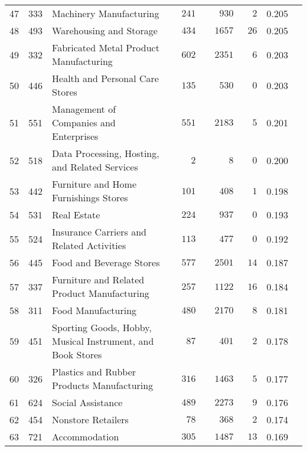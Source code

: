 \documentclass[9pt, oneside]{article}   	%
\begin{document}
\begin{longtable}{lcp{3 in}ccccc}
47  & 333 & Machinery Manufacturing & $\phantom{00}241$ & $\phantom{000}930$ & $\phantom{00}2$ & 0.205 \\
48  & 493 & Warehousing and Storage & $\phantom{00}434$ & $\phantom{00}1657$ & $\phantom{0}26$ & 0.205 \\
49  & 332 & Fabricated Metal Product Manufacturing & $\phantom{00}602$ & $\phantom{00}2351$ & $\phantom{00}6$ & 0.203 \\
50  & 446 & Health and Personal Care Stores & $\phantom{00}135$ & $\phantom{000}530$ & $\phantom{00}0$ & 0.203 \\
51  & 551 & Management of Companies and Enterprises & $\phantom{00}551$ & $\phantom{00}2183$ & $\phantom{00}5$ & 0.201 \\
52  & 518 & Data Processing, Hosting, and Related Services & $\phantom{0000}2$ & $\phantom{00000}8$ & $\phantom{00}0$ & 0.200 \\
53  & 442 & Furniture and Home Furnishings Stores & $\phantom{00}101$ & $\phantom{000}408$ & $\phantom{00}1$ & 0.198 \\
54  & 531 & Real Estate & $\phantom{00}224$ & $\phantom{000}937$ & $\phantom{00}0$ & 0.193 \\
55  & 524 & Insurance Carriers and Related Activities & $\phantom{00}113$ & $\phantom{000}477$ & $\phantom{00}0$ & 0.192 \\
56  & 445 & Food and Beverage Stores & $\phantom{00}577$ & $\phantom{00}2501$ & $\phantom{0}14$ & 0.187 \\
57  & 337 & Furniture and Related Product Manufacturing & $\phantom{00}257$ & $\phantom{00}1122$ & $\phantom{0}16$ & 0.184 \\
58  & 311 & Food Manufacturing & $\phantom{00}480$ & $\phantom{00}2170$ & $\phantom{00}8$ & 0.181 \\
59  & 451 & Sporting Goods, Hobby, Musical Instrument, and Book Stores & $\phantom{000}87$ & $\phantom{000}401$ & $\phantom{00}2$ & 0.178 \\
60  & 326 & Plastics and Rubber Products Manufacturing & $\phantom{00}316$ & $\phantom{00}1463$ & $\phantom{00}5$ & 0.177 \\
61  & 624 & Social Assistance & $\phantom{00}489$ & $\phantom{00}2273$ & $\phantom{00}9$ & 0.176 \\
62  & 454 & Nonstore Retailers & $\phantom{000}78$ & $\phantom{000}368$ & $\phantom{00}2$ & 0.174 \\
63  & 721 & Accommodation & $\phantom{00}305$ & $\phantom{00}1487$ & $\phantom{0}13$ & 0.169 \\

\end{longtable}
\end{document}
